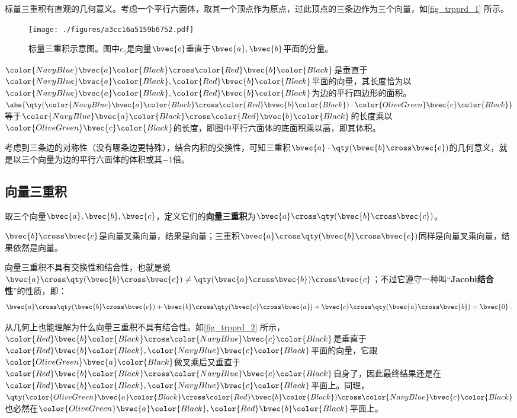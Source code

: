 标量三重积有直观的几何意义。考虑一个平行六面体，取其一个顶点作为原点，过此顶点的三条边作为三个向量，如\autoref{fig_trpprd_1} 所示。


\begin{figure}[ht]
\centering
\texttt{[image: ./figures/a3cc16a5159b6752.pdf]}
\caption{标量三重积示意图。图中$c_\parallel$是向量$\bvec{c}$垂直于$\bvec{a}, \bvec{b}$平面的分量。} \label{fig_trpprd_1}
\end{figure}

$\color{NavyBlue}\bvec{a}\color{Black}\cross\color{Red}\bvec{b}\color{Black}$是垂直于$\color{NavyBlue}\bvec{a}\color{Black}, \color{Red}\bvec{b}\color{Black}$平面的向量，其长度恰为以$\color{NavyBlue}\bvec{a}\color{Black}, \color{Red}\bvec{b}\color{Black}$为边的平行四边形的面积。$\abs{\qty(\color{NavyBlue}\bvec{a}\color{Black}\cross\color{Red}\bvec{b}\color{Black})\cdot\color{OliveGreen}\bvec{c}\color{Black}}$等于$\color{NavyBlue}\bvec{a}\color{Black}\cross\color{Red}\bvec{b}\color{Black}$的长度乘以$\color{OliveGreen}\bvec{c}\color{Black}$的长度，即图中平行六面体的底面积乘以高，即其体积。

考虑到三条边的对称性（没有哪条边更特殊），结合内积的交换性，可知三重积$\bvec{a}\cdot\qty(\bvec{b}\cross\bvec{c})$的几何意义，就是以三个向量为边的平行六面体的体积或其$-1$倍。


\subsection{向量三重积}

取三个向量$\bvec{a}, \bvec{b}, \bvec{c}$，定义它们的\textbf{向量三重积}为$\bvec{a}\cross\qty(\bvec{b}\cross\bvec{c})$。

$\bvec{b}\cross\bvec{c}$是向量叉乘向量，结果是向量；三重积$\bvec{a}\cross\qty(\bvec{b}\cross\bvec{c})$同样是向量叉乘向量，结果依然是向量。

向量三重积不具有交换性和结合性，也就是说$\bvec{a}\cross\qty(\bvec{b}\cross\bvec{c})\neq \qty(\bvec{a}\cross\bvec{b})\cross\bvec{c}$；不过它遵守一种叫“\textbf{Jacobi结合性}”的性质，即：
\begin{equation}
\bvec{a}\cross\qty(\bvec{b}\cross\bvec{c})+\bvec{b}\cross\qty(\bvec{c}\cross\bvec{a})+\bvec{c}\cross\qty(\bvec{a}\cross\bvec{b})=\bvec{0}~.
\end{equation}

从几何上也能理解为什么向量三重积不具有结合性。如\autoref{fig_trpprd_2} 所示，$\color{Red}\bvec{b}\color{Black}\cross\color{NavyBlue}\bvec{c}\color{Black}$是垂直于$\color{Red}\bvec{b}\color{Black}, \color{NavyBlue}\bvec{c}\color{Black}$平面的向量，它跟$\color{OliveGreen}\bvec{a}\color{Black}$做叉乘后又垂直于$\color{Red}\bvec{b}\color{Black}\cross\color{NavyBlue}\bvec{c}\color{Black}$自身了，因此最终结果还是在$\color{Red}\bvec{b}\color{Black}, \color{NavyBlue}\bvec{c}\color{Black}$平面上。同理，$\qty(\color{OliveGreen}\bvec{a}\color{Black}\cross\color{Red}\bvec{b}\color{Black})\cross\color{NavyBlue}\bvec{c}\color{Black}$也必然在$\color{OliveGreen}\bvec{a}\color{Black}, \color{Red}\bvec{b}\color{Black}$平面上。

